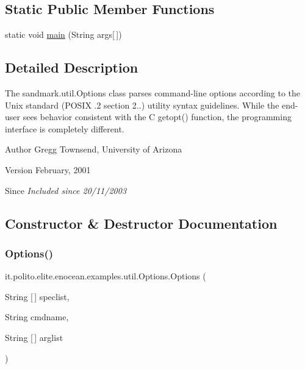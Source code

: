 \subsection*{Static Public Member Functions}
\begin{DoxyCompactItemize}
\item 
static void \hyperlink{classit_1_1polito_1_1elite_1_1enocean_1_1examples_1_1util_1_1_options_a4695dea560787146c16df39b95b712e2}{main} (String args\mbox{[}$\,$\mbox{]})
\end{DoxyCompactItemize}


\subsection{Detailed Description}
The sandmark.\+util.\+Options class parses command-\/line options according to the Unix standard (P\+O\+S\+IX .2 section 2..) utility syntax guidelines. While the end-\/user sees behavior consistent with the C getopt() function, the programming interface is completely different. \begin{DoxyAuthor}{Author}
Gregg Townsend, University of Arizona 
\end{DoxyAuthor}
\begin{DoxyVersion}{Version}
February, 2001 
\end{DoxyVersion}
\begin{DoxySince}{Since}
{\itshape Included since 20/11/2003} 
\end{DoxySince}


\subsection{Constructor \& Destructor Documentation}
\hypertarget{classit_1_1polito_1_1elite_1_1enocean_1_1examples_1_1util_1_1_options_a9b3777ed58f5e94eb786a17d1dcf179a}{}\label{classit_1_1polito_1_1elite_1_1enocean_1_1examples_1_1util_1_1_options_a9b3777ed58f5e94eb786a17d1dcf179a} 
\subsubsection{\texorpdfstring{Options()}{Options()}\hspace{0.1cm}{\footnotesize\ttfamily [1/2]}}
{\footnotesize\ttfamily it.\+polito.\+elite.\+enocean.\+examples.\+util.\+Options.\+Options (\begin{DoxyParamCaption}\item[{String \mbox{[}$\,$\mbox{]}}]{speclist,  }\item[{String}]{cmdname,  }\item[{String \mbox{[}$\,$\mbox{]}}]{arglist }\end{DoxyParamCaption})}

